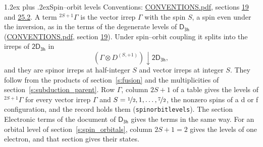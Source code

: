 \documentclass[10pt,a4paper]{article}
\makeatletter
\renewcommand\section{\@startsection{section}{1}{\z@}{-3ex plus -1ex minus -.2ex}%
  {1.2ex plus .2ex}{\normalfont\large\sffamily\bfseries\color{parttitle}}}
\numberwithin{equation}{section}
\newcommand{\grp}[1]{\mathsf{#1}}
\newcommand{\restr}[2]{#1\!\downarrow#2}
\newcommand{\irrJp}[2]{D^{(#1,#2)}}
\newcommand{\irrprod}{\otimes}
\newcommand{\term}[2]{{}^{#1}#2}
\makeatother
\begin{document}
\section{Spin--orbit levels}\label{s:spin_orbit}
Conventions: \href{../../CONVENTIONS.pdf}{CONVENTIONS.pdf}, sections \href{../../../rotation/CONVENTIONS.pdf\#conv.19}{19} and \href{../../CONVENTIONS.pdf\#conv.25.2}{25.2}.
\leavevmode\label{n:local.spin}\label{n:symbol.term}A term $\term{2S+1}{\Gamma}$ is the vector irrep $\Gamma$ with the spin $S$, a spin even under the inversion, as in the terms of the degenerate levels of \href{../../../rotation/data/pdf/D3h.pdf}{$\grp{D_{3h}}$} (\href{../../CONVENTIONS.pdf}{CONVENTIONS.pdf}, section \href{../../../rotation/CONVENTIONS.pdf\#conv.19}{19}). Under spin--orbit coupling it splits into the irreps of $\grp{2D_{3h}}$ in
\begin{equation}\label{e:spinorbit}\restr{(\Gamma \irrprod \irrJp{S}{+1})}{\grp{2D_{3h}}},\end{equation}
and they are spinor irreps at half-integer $S$ and vector irreps at integer $S$. They follow from the products of section~\ref{s:fusion} and the multiplicities of section~\ref{s:subduction_parent}. Row $\Gamma$, column $2S + 1$ of a table gives the levels of $\term{2S+1}{\Gamma}$ for every vector irrep $\Gamma$ and $S = \nicefrac{1}{2}, 1, \dots, \nicefrac{7}{2}$, the nonzero spins of a d or f configuration, and the record holds them (\texttt{spinorbitlevels}). The section Electronic terms of the document of \href{../../../rotation/data/pdf/D3h.pdf}{$\grp{D_{3h}}$} gives the terms in the same way. For an orbital level of section~\ref{s:spin_orbitals}, column $2S + 1 = 2$ gives the levels of one electron, and that section gives their states.
\end{document}
